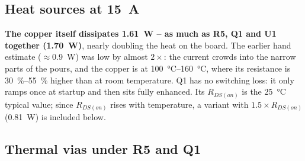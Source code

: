 \documentclass[11pt,letterpaper]{article}
\begin{document}
\subsection{Heat sources at \SI{15}{\ampere}}

\begin{center}
\end{center}

\textbf{The copper itself dissipates \SI{1.61}{\watt} -- as much as R5, Q1 and U1 together
(\SI{1.70}{\watt})}, nearly doubling the heat on the board. The earlier hand estimate
($\approx$\SI{0.9}{\watt}) was low by almost $2\times$: the current crowds into the narrow parts of the
pours, and the copper is at \SIrange{100}{160}{\celsius}, where its resistance is \SIrange{30}{55}{\percent}
higher than at room temperature. Q1 has no switching loss: it only ramps once at startup and then sits
fully enhanced. Its $R_{DS(on)}$ is the \SI{25}{\celsius} typical value; since $R_{DS(on)}$ rises with
temperature, a variant with $1.5\times R_{DS(on)}$ (\SI{0.81}{\watt}) is included below.

\subsection{Thermal vias under R5 and Q1}
\label{sec:vias}
\end{document}

